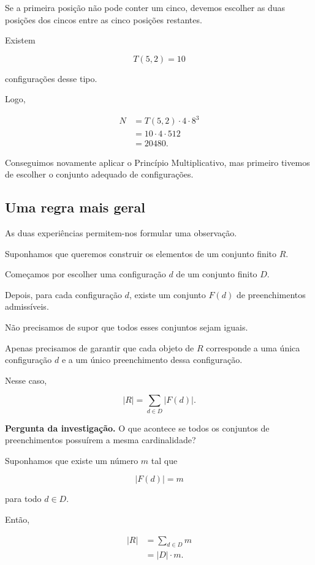 \documentclass[11pt,a4paper,oneside]{book}
\newcommand{\Pergunta}[1]{\begin{perguntabox}\textbf{Pergunta da investigação.} #1\end{perguntabox}}
\newcommand{\card}[1]{\lvert #1\rvert}
\begin{document}
Se a primeira posição não pode
conter um cinco, devemos escolher
as duas posições dos cincos
entre as cinco posições restantes.

Existem

\[
T(5,2)=10
\]

configurações desse tipo.

Logo,

\[
\begin{aligned}
N
&=T(5,2)\cdot4\cdot8^3\\
&=10\cdot4\cdot512\\
&=\boxed{20480}.
\end{aligned}
\]

Conseguimos novamente aplicar
o Princípio Multiplicativo,
mas primeiro tivemos de escolher
o conjunto adequado de configurações.

\subsection*{Uma regra mais geral}

As duas experiências permitem-nos
formular uma observação.

Suponhamos que queremos construir
os elementos de um conjunto finito $R$.

Começamos por escolher uma configuração
$d$ de um conjunto finito $D$.

Depois, para cada configuração $d$,
existe um conjunto $F(d)$
de preenchimentos admissíveis.

Não precisamos de supor que
todos esses conjuntos sejam iguais.

Apenas precisamos de garantir
que cada objeto de $R$ corresponde
a uma única configuração $d$
e a um único preenchimento dessa configuração.

Nesse caso,

\[
\boxed{
\card R=\sum_{d\in D}\card{F(d)}
}.
\]

\Pergunta{O que acontece se todos
os conjuntos de preenchimentos
possuírem a mesma cardinalidade?}

Suponhamos que existe um número $m$
tal que

\[
\card{F(d)}=m
\]

para todo $d\in D$.

Então,

\[
\begin{aligned}
\card R
&=\sum_{d\in D}m\\
&=\card D\cdot m.
\end{aligned}
\]
\end{document}
